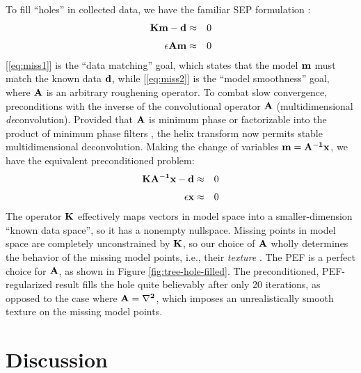 	To fill ``holes'' in collected data, we have the familiar SEP formulation 
	{\small \cite[]{gee}}:
	\begin{eqnarray}
		\bf Km - d &\approx& 0 \label{eq:miss1} \\[0.05in]
		\bf \epsilon Am &\approx& 0 \label{eq:miss2}
	\end{eqnarray}
	[\ref{eq:miss1}] is the ``data matching'' goal, which states that the model $\bf m$
	must match the known data $\bf d$, while [\ref{eq:miss2}] is the ``model smoothness''
	goal, where $\bf A$ is an arbitrary roughening operator.  To combat slow convergence,
	\cite{gee} preconditions with the inverse of the convolutional 
	operator $\bf A$ (multidimensional {\em de}convolution).  Provided that
	$\bf A$ is minimum phase or factorizable into the product of minimum phase filters
	\cite[]{Sava.sep.97.paul1},
	the helix transform now permits stable multidimensional deconvolution.  Making
	the change of variables $\bf m = A^{-1}x$, we have the equivalent preconditioned problem:
	\begin{eqnarray}
		\bf KA^{-1}x - d &\approx& 0 \label{eq:prec1} \\[0.05in]
		\bf \epsilon x &\approx& 0 \label{eq:prec2}
	\end{eqnarray}
	The operator $\bf K$ effectively maps vectors in model space into 
	a smaller-dimension ``known data space'', so it has a nonempty nullspace.
	Missing points in model space are completely unconstrained by $\bf K$, so
	our choice of $\bf A$ wholly determines the behavior of the missing model points, i.e.,
	their {\em texture} {\small \cite[]{Fomel.sep.95.sergey1}}.  
	The PEF is a perfect choice for $\bf A$, as shown in Figure
	\ref{fig:tree-hole-filled}.  The preconditioned, PEF-regularized result fills the
	hole quite believably after only 20 iterations, as opposed to the case where
	$\bf A = \nabla^2$, which imposes an unrealistically smooth texture on the missing 
	model points.  


\section{ Discussion}

